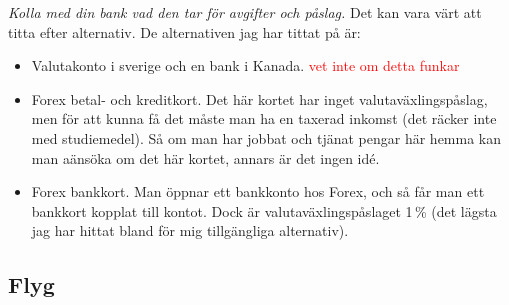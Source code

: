 \documentclass[11pt,a4paper, english, swedish]{article}
\begin{document}
\emph{Kolla med din bank vad den tar för avgifter och påslag.} Det kan
vara värt att titta efter alternativ. 
De alternativen jag har tittat på är: 
\begin{itemize}
\item Valutakonto i sverige och en bank i Kanada. \textcolor{red}{vet
    inte om detta funkar}
\item Forex betal- och kreditkort. Det här kortet har inget
  valutaväxlingspåslag, men för att kunna få det måste man ha en
  taxerad inkomst (det räcker inte med studiemedel). Så om man har
  jobbat och tjänat pengar här hemma kan man aänsöka om det här
  kortet, annars är det ingen idé.
\item Forex bankkort. Man öppnar ett bankkonto hos Forex, och så får
  man ett bankkort kopplat till kontot. Dock är valutaväxlingspåslaget
  1\,\% (det lägsta jag har hittat bland för mig tillgängliga alternativ). 
\end{itemize}

\subsection{Flyg}
\end{document}
